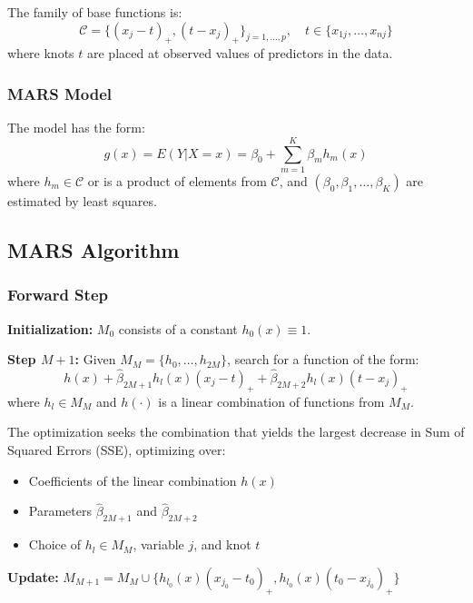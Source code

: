 \documentclass[12pt,a4paper]{article}
\begin{document}
The family of base functions is:
\begin{equation}
\mathcal{C} = \{(x_j - t)_+, (t - x_j)_+\}_{j=1,\ldots,p}, \quad t \in \{x_{1j}, \ldots, x_{nj}\}
\end{equation}
where knots $t$ are placed at observed values of predictors in the data.

\subsubsection{MARS Model}

The model has the form:
\begin{equation}
g(x) = E(Y|X = x) = \beta_0 + \sum_{m=1}^K \beta_m h_m(x)
\end{equation}
where $h_m \in \mathcal{C}$ or is a product of elements from $\mathcal{C}$, and $(\beta_0, \beta_1, \ldots, \beta_K)$ are estimated by least squares.

\subsection{MARS Algorithm}

\subsubsection{Forward Step}

\textbf{Initialization:} $M_0$ consists of a constant $h_0(x) \equiv 1$.

\textbf{Step $M+1$:} Given $M_M = \{h_0, \ldots, h_{2M}\}$, search for a function of the form:
\begin{equation}
h(x) + \hat{\beta}_{2M+1} h_l(x)(x_j - t)_+ + \hat{\beta}_{2M+2} h_l(x)(t - x_j)_+
\end{equation}
where $h_l \in M_M$ and $h(\cdot)$ is a linear combination of functions from $M_M$.

The optimization seeks the combination that yields the largest decrease in Sum of Squared Errors (SSE), optimizing over:
\begin{itemize}
    \item Coefficients of the linear combination $h(x)$
    \item Parameters $\hat{\beta}_{2M+1}$ and $\hat{\beta}_{2M+2}$
    \item Choice of $h_l \in M_M$, variable $j$, and knot $t$
\end{itemize}

\textbf{Update:} $M_{M+1} = M_M \cup \{h_{l_0}(x)(x_{j_0} - t_0)_+, h_{l_0}(x)(t_0 - x_{j_0})_+\}$
\end{document}

